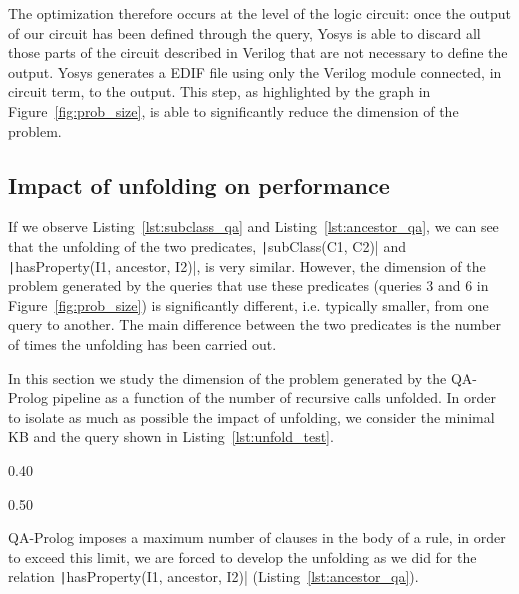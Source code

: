 The optimization therefore occurs at the level of the logic circuit: once the output of our circuit has been defined through the query, Yosys is able to discard all those parts of the circuit described in Verilog that are not necessary to define the output. Yosys generates a EDIF file using only the Verilog module connected, in circuit term, to the output. This step, as highlighted by the graph in Figure~\ref{fig:prob_size}, is able to significantly reduce the dimension of the problem.

\subsection{Impact of unfolding on performance}
\label{sec:unfold_performance}
If we observe Listing~\ref{lst:subclass_qa} and Listing~\ref{lst:ancestor_qa}, we can see that the unfolding of the two predicates, \texttt|subClass(C1, C2)| and \texttt|hasProperty(I1, ancestor, I2)|, is very similar. However, the dimension of the problem generated by the queries that use these predicates (queries $3$ and $6$ in Figure~\ref{fig:prob_size}) is significantly different, i.e. typically smaller, from one query to another. The main difference between the two predicates is the number of times the unfolding has been carried out.

In this section we study the dimension of the problem generated by the QA-Prolog pipeline as a function of the number of recursive calls unfolded. In order to isolate as much as possible the impact of unfolding, we consider the minimal KB and the query shown in Listing~\ref{lst:unfold_test}.

\begin{listingenv}[h]
	\centering
	\begin{sublisting}[c]{0.40\linewidth}
		\caption{Prolog File (KB)}
	\end{sublisting}
	\qquad
	\begin{sublisting}[c]{0.50\linewidth}
		\caption{Query}
	\end{sublisting}
	\caption{Input unfold}
	\label{lst:unfold_test}
\end{listingenv}

QA-Prolog imposes a maximum number of clauses in the body of a rule, in order to exceed this limit, we are forced to develop the unfolding as we did for the relation \texttt|hasProperty(I1, ancestor, I2)| (Listing~\ref{lst:ancestor_qa}).

